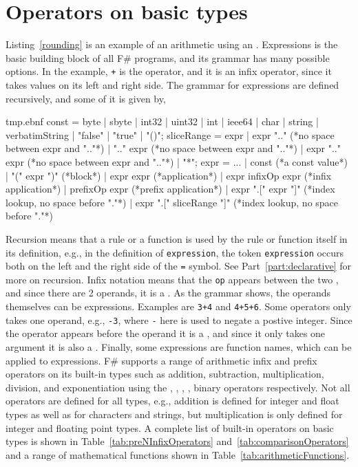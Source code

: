 \section{Operators on basic types}
Listing~\ref{rounding} is an example of an arithmetic  using an . Expressions is the basic building block of all F\# programs, and its grammar has many possible options. In the example, \lstinline!+! is the operator, and it is an infix operator, since it takes values on its left and right side. The grammar for expressions are defined recursively, and some of it is given by, 
%
\begin{verbatimwrite}{tmp.ebnf}
const = byte | sbyte | int32 | uint32 | int | ieee64 | char | string 
  | verbatimString | "false" | "true" | "()";
sliceRange = 
  expr 
  | expr ".." (*no space between expr and ".."*)
  | ".." expr (*no space between expr and ".."*)
  | expr ".." expr (*no space between expr and ".."*)
  | "*";
expr = ...
  | const (*a const value*)
  | "(" expr ")" (*block*)
  | expr expr (*application*)
  | expr infixOp expr (*infix application*)
  | prefixOp expr (*prefix application*)
  | expr ".[" expr "]" (*index lookup, no space before "."*)
  | expr ".[" sliceRange "]" (*index lookup, no space before "."*)
\end{verbatimwrite}
%
Recursion means that a rule or a function is used by the rule or function itself in its definition, e.g., in the definition of \lstinline[language=ebnf]!expression!, the token \lstinline[language=ebnf]!expression! occurs both on the left and the right side of the \lstinline[language=ebnf]!=! symbol. See Part~\ref{part:declarative} for more on recursion. Infix notation means that the  \lstinline[language=ebnf]!op! appears between the two , and since there are 2 operands, it is a . As the grammar shows, the operands themselves can be expressions. Examples are \lstinline!3+4! and \lstinline!4+5+6!. Some operators only takes one operand, e.g., \lstinline!-3!, where \lstinline!-! here is used to negate a postive integer. Since the operator appears before the operand it is a , and since it only takes one argument it is also a . Finally, some expressions are function names, which can be applied to expressions. F\# supports a range of arithmetic infix and prefix operators on its built-in types such as addition, subtraction, multiplication, division, and exponentiation using the \lexeme{+}, \lexeme{-}, \lexeme{*}, \lexeme{/}, \lexeme{**} binary operators respectively. Not all operators are defined for all types, e.g., addition is defined for integer and float types as well as for characters and strings, but multiplication is only defined for integer and floating point types. A complete list of built-in operators on basic types is shown in Table~\ref{tab:preNInfixOperators} and~\ref{tab:comparisonOperators} and a range of mathematical functions shown in Table~\ref{tab:arithmeticFunctions}.

